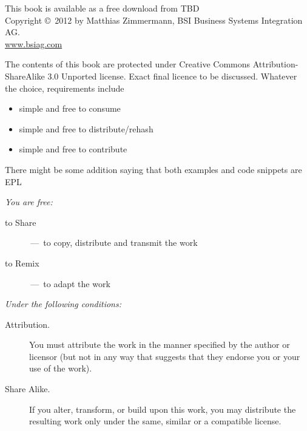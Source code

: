 
\vfill
\begin{footnotesize}
\setlength{\parindent}{0pt}
This book is available as a free download from TBD \\[1cm]

Copyright \copyright~2012 by Matthias Zimmermann, BSI Business Systems Integration AG. \\ \url{www.bsiag.com} 
\vspace{5mm}

The contents of this book are protected under Creative Commons Attribution-ShareAlike 3.0 Unported license.
Exact final licence to be discussed. Whatever the choice, requirements include
\begin{itemize}
  \item simple and free to consume
  \item simple and free to distribute/rehash
  \item simple and free to contribute
\end{itemize} 

There might be some addition saying that both examples and code snippets are EPL

\vspace{5mm}

\emph{You are free:}
\begin{description}
  \item[to Share] \,---\, to copy, distribute and transmit the work
  \item[to Remix] \,---\, to adapt the work
\end{description} 
\vspace{5mm}

\emph{Under the following conditions:}
\begin{description}
  \item[Attribution.] You must attribute the work in the manner specified by the author or licensor (but not in any way that suggests that they endorse you or your use of the work).
  \item[Share Alike.] If you alter, transform, or build upon this work, you may distribute the resulting work only under the same, similar or a compatible license.
\end{description}


\end{footnotesize}
